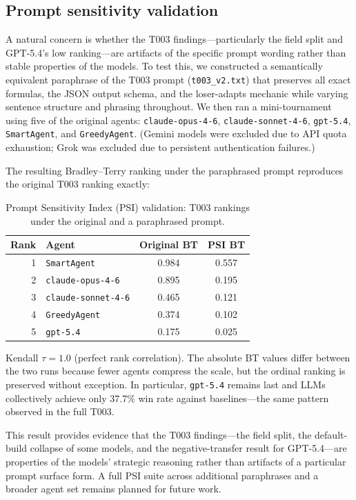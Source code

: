 \documentclass[11pt]{article}
\newcommand{\tThree}{T003}
\begin{document}
\subsection{Prompt sensitivity validation}

A natural concern is whether the \tThree{} findings---particularly the field split and GPT-5.4's low ranking---are artifacts of the specific prompt wording rather than stable properties of the models.
To test this, we constructed a semantically equivalent paraphrase of the \tThree{} prompt (\texttt{t003\_v2.txt}) that preserves all exact formulas, the JSON output schema, and the loser-adapts mechanic while varying sentence structure and phrasing throughout.
We then ran a mini-tournament using five of the original agents: \texttt{claude-opus-4-6}, \texttt{claude-sonnet-4-6}, \texttt{gpt-5.4}, \texttt{SmartAgent}, and \texttt{GreedyAgent}.
(Gemini models were excluded due to API quota exhaustion; Grok was excluded due to persistent authentication failures.)

The resulting Bradley--Terry ranking under the paraphrased prompt reproduces the original \tThree{} ranking exactly:

\begin{table}[h]
\centering
\small
\caption{Prompt Sensitivity Index (PSI) validation: \tThree{} rankings under the original and a paraphrased prompt.}
\label{tab:psi}
\begin{tabular}{rlcc}
\toprule
Rank & Agent & Original BT & PSI BT \\
\midrule
1 & \texttt{SmartAgent} & 0.984 & 0.557 \\
2 & \texttt{claude-opus-4-6} & 0.895 & 0.195 \\
3 & \texttt{claude-sonnet-4-6} & 0.465 & 0.121 \\
4 & \texttt{GreedyAgent} & 0.374 & 0.102 \\
5 & \texttt{gpt-5.4} & 0.175 & 0.025 \\
\bottomrule
\end{tabular}
\end{table}

Kendall $\tau = 1.0$ (perfect rank correlation).
The absolute BT values differ between the two runs because fewer agents compress the scale, but the ordinal ranking is preserved without exception.
In particular, \texttt{gpt-5.4} remains last and LLMs collectively achieve only 37.7\% win rate against baselines---the same pattern observed in the full \tThree.

This result provides evidence that the \tThree{} findings---the field split, the default-build collapse of some models, and the negative-transfer result for GPT-5.4---are properties of the models' strategic reasoning rather than artifacts of a particular prompt surface form.
A full PSI suite across additional paraphrases and a broader agent set remains planned for future work.
\end{document}
